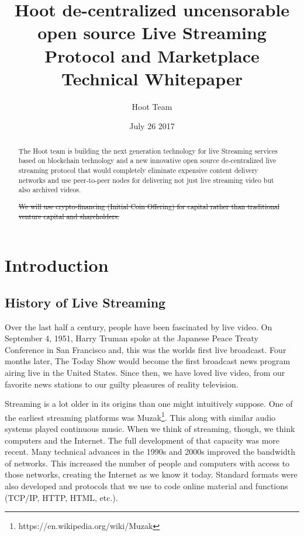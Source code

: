 \documentclass{article}
\title{Hoot de-centralized uncensorable open source Live Streaming Protocol and Marketplace Technical Whitepaper}
\author{Hoot Team}
\date{July 26 2017}
\begin{document}
\maketitle

\begin{abstract}
The Hoot team is building the next generation technology for live
Streaming services based on blockchain technology and a new
innovative open source de-centralized live streaming protocol that would completely eliminate expensive content delivery networks and use peer-to-peer nodes for delivering not just live streaming video but also archived videos.

\sout{We will use crypto-financing (Initial Coin Offering) for capital rather than traditional venture capital and shareholders.}

\end{abstract}
\newpage

\tableofcontents
\newpage

\section{Introduction}
\subsection{History of Live Streaming}
Over the last half a century, people have been fascinated by live video. On September 4, 1951, Harry Truman spoke at the Japanese Peace Treaty Conference in San Francisco and, this was the worlds first live broadcast. Four months later, The Today Show would become the first broadcast news program airing live in the United States. Since then, we have loved live video, from our favorite news stations to our guilty pleasures of reality television.

Streaming is a lot older in its origins than one might intuitively suppose. One of the earliest streaming platforms was Muzak\footnote{https://en.wikipedia.org/wiki/Muzak}. This along with similar audio systems played continuous music. When we think of streaming, though, we think computers and the Internet. The full development of that capacity was more recent. Many technical advances in the 1990s and 2000s improved the bandwidth of networks. This increased the number of people and computers with access to those networks, creating the Internet as we know it today. Standard formats were also developed and protocols that we use to code online material and functions (TCP/IP, HTTP, HTML, etc.).
\end{document}
